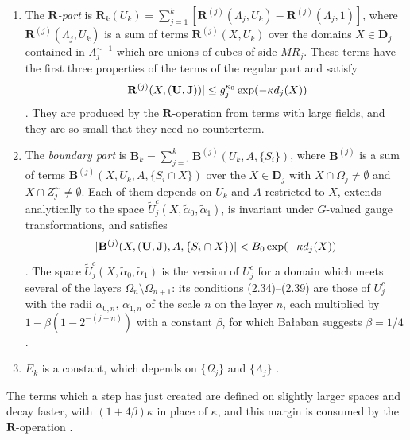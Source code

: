 \documentclass[11pt]{preprint}
\DeclarePairedDelimiter{\abs}{\lvert}{\rvert}
\numberwithin{equation}{section}
\theoremstyle{definition}
\theoremstyle{remark}
\theoremstyle{plain}
\begin{document}
\begin{enumerate}[label=(\alph*)]
\item The \emph{$\mathbf R$-part} is $\mathbf R_k(U_k) = \sum_{j=1}^{k}[\mathbf R^{(j)}(\Lambda_j, U_k) - \mathbf R^{(j)}(\Lambda_j, 1)]$, where $\mathbf R^{(j)}(\Lambda_j, U_k)$ is a sum of terms $\mathbf R^{(j)}(X, U_k)$ over the domains $X \in \mathbf D_j$ contained in $\Lambda_j^{\sim-1}$ which are unions of cubes of side $MR_j$. These terms have the first three properties of the terms of the regular part and satisfy
\begin{equation}\label{eq:r-bound}
    \abs{\mathbf R^{(j)}(X, (\mathbf U, \mathbf J))} \leq g_j^{\kappa_0}\exp(-\kappa d_j(X))
\end{equation}
\cite[(2.30), (2.31), p.~260]{BalabanCRE}. They are produced by the $\mathbf R$-operation from terms with large fields, and they are so small that they need no counterterm.
\item The \emph{boundary part} is $\mathbf B_k = \sum_{j=1}^{k}\mathbf B^{(j)}(U_k, A, \{ S_i \})$, where $\mathbf B^{(j)}$ is a sum of terms $\mathbf B^{(j)}(X, U_k, A, \{ S_i \cap X \})$ over the $X \in \mathbf D_j$ with $X \cap \Omega_j \neq \emptyset$ and $X \cap Z_j^{\sim} \neq \emptyset$. Each of them depends on $U_k$ and $A$ restricted to $X$, extends analytically to the space $\tilde U_j^c(X, \tilde\alpha_0, \tilde\alpha_1)$, is invariant under $G$-valued gauge transformations, and satisfies
\begin{equation}\label{eq:boundary-bound}
    \abs{\mathbf B^{(j)}(X, (\mathbf U, \mathbf J), A, \{ S_i \cap X \})} < B_0\exp(-\kappa d_j(X))
\end{equation}
\cite[(2.40)--(2.42), p.~261]{BalabanCRE}. The space $\tilde U_j^c(X, \tilde\alpha_0, \tilde\alpha_1)$ is the version of $U_j^c$ for a domain which meets several of the layers $\Omega_n \setminus \Omega_{n+1}$: its conditions (2.34)--(2.39) are those of $U_j^c$ with the radii $\alpha_{0,n}$, $\alpha_{1,n}$ of the scale $n$ on the layer $n$, each multiplied by $1 - \beta(1 - 2^{-(j-n)})$ with a constant $\beta$, for which Ba{\l}aban suggests $\beta = 1/4$ \cite[p.~261]{BalabanCRE}.
\item $E_k$ is a constant, which depends on $\{ \Omega_j \}$ and $\{ \Lambda_j \}$ \cite[p.~262]{BalabanCRE}.
\end{enumerate}
The terms which a step has just created are defined on slightly larger spaces and decay faster, with $(1 + 4\beta)\kappa$ in place of $\kappa$, and this margin is consumed by the $\mathbf R$-operation \cite[p.~262]{BalabanCRE}.
\end{document}
